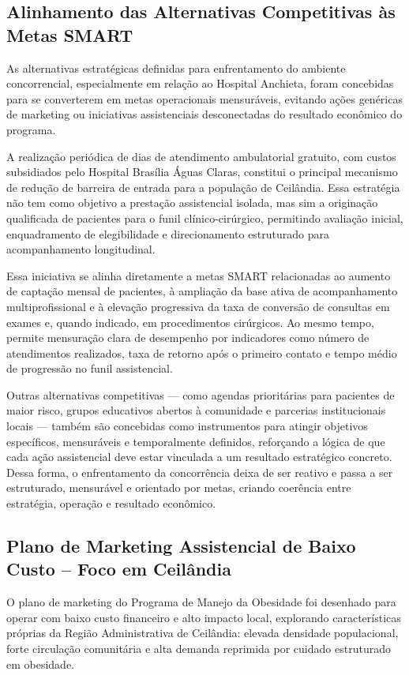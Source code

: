\documentclass[12pt]{article}
\begin{document}
\subsection{Alinhamento das Alternativas Competitivas às Metas SMART}
\label{sec:org1a80665}
As alternativas estratégicas definidas para enfrentamento do ambiente concorrencial, especialmente em relação ao Hospital Anchieta, foram concebidas para se converterem em metas operacionais mensuráveis, evitando ações genéricas de marketing ou iniciativas assistenciais desconectadas do resultado econômico do programa.

A realização periódica de dias de atendimento ambulatorial gratuito, com custos subsidiados pelo Hospital Brasília Águas Claras, constitui o principal mecanismo de redução de barreira de entrada para a população de Ceilândia. Essa estratégia não tem como objetivo a prestação assistencial isolada, mas sim a originação qualificada de pacientes para o funil clínico-cirúrgico, permitindo avaliação inicial, enquadramento de elegibilidade e direcionamento estruturado para acompanhamento longitudinal.

Essa iniciativa se alinha diretamente a metas SMART relacionadas ao aumento de captação mensal de pacientes, à ampliação da base ativa de acompanhamento multiprofissional e à elevação progressiva da taxa de conversão de consultas em exames e, quando indicado, em procedimentos cirúrgicos. Ao mesmo tempo, permite mensuração clara de desempenho por indicadores como número de atendimentos realizados, taxa de retorno após o primeiro contato e tempo médio de progressão no funil assistencial.

Outras alternativas competitivas — como agendas prioritárias para pacientes de maior risco, grupos educativos abertos à comunidade e parcerias institucionais locais — também são concebidas como instrumentos para atingir objetivos específicos, mensuráveis e temporalmente definidos, reforçando a lógica de que cada ação assistencial deve estar vinculada a um resultado estratégico concreto. Dessa forma, o enfrentamento da concorrência deixa de ser reativo e passa a ser estruturado, mensurável e orientado por metas, criando coerência entre estratégia, operação e resultado econômico.

\subsection{Plano de Marketing Assistencial de Baixo Custo – Foco em Ceilândia}
\label{sec:orgac91157}
O plano de marketing do Programa de Manejo da Obesidade foi desenhado para operar com baixo custo financeiro e alto impacto local, explorando características próprias da Região Administrativa de Ceilândia: elevada densidade populacional, forte circulação comunitária e alta demanda reprimida por cuidado estruturado em obesidade.
\end{document}
